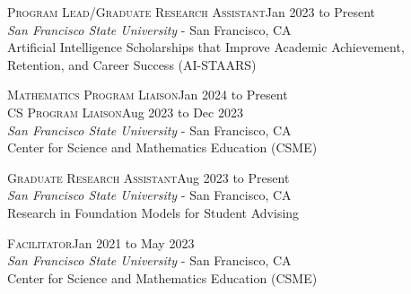 \documentclass[hidelinks, 10pt]{article}
\begin{document}
{%

\vspace{5mm}
\hrulefill

\vspace{4mm}

\begin{minipage}[ct]{0.9\linewidth}
\textsc{Program Lead/Graduate Research Assistant}\hfill Jan 2023 to Present\\
{\emph{San Francisco State University} - San Francisco, CA}\\
Artificial Intelligence Scholarships that Improve Academic Achievement, Retention, and Career Success (AI-STAARS)
\end{minipage}

\vspace{2.5mm}

\begin{minipage}[ct]{0.9\linewidth}
\textsc{Mathematics Program Liaison}\hfill Jan 2024 to Present\\
\textsc{CS Program Liaison}\hfill Aug 2023 to Dec 2023\\
{\emph{San Francisco State University} - San Francisco, CA}\\
Center for Science and Mathematics Education (CSME)
\end{minipage}

\vspace{2.5mm}

\begin{minipage}[ct]{0.9\linewidth}
\textsc{Graduate Research Assistant}\hfill Aug 2023 to Present\\
{\emph{San Francisco State University} - San Francisco, CA}\\
Research in Foundation Models for Student Advising
\end{minipage}

\vspace{2.5mm}

\begin{minipage}[ct]{0.9\linewidth}
\textsc{Facilitator}\hfill Jan 2021 to May 2023\\
{\emph{San Francisco State University} - San Francisco, CA}\\
Center for Science and Mathematics Education (CSME)
\end{minipage}

}
\end{document}

